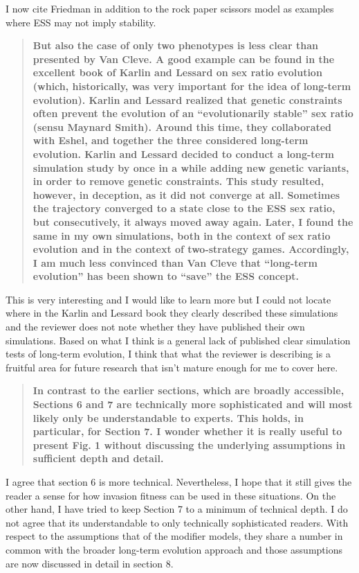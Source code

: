 \documentclass[10pt,parskip=full,foldmarks=off,addrfield=off,backaddress=false,refline=dateleft,letterpaper]{scrlttr2}
\newenvironment{reviewerquote}{\begin{quote}\color{DarkBlue}\bfseries}{\end{quote}}
\begin{document}
\begin{letter}
I now cite Friedman in addition to the rock paper scissors model as examples where ESS may not imply stability.

\begin{reviewerquote}
  But also the case of only two phenotypes is less clear than presented by Van Cleve. A good example can be found in the excellent book of Karlin and Lessard on sex ratio evolution (which, historically, was very important for the idea of long-term evolution). Karlin and Lessard realized that genetic constraints often prevent the evolution of an “evolutionarily stable” sex ratio (sensu Maynard Smith). Around this time, they collaborated with Eshel, and together the three considered long-term evolution. Karlin and Lessard decided to conduct a long-term simulation study by once in a while adding new genetic variants, in order to remove genetic constraints. This study resulted, however, in deception, as it did not converge at all. Sometimes the trajectory converged to a state close to the ESS sex ratio, but consecutively, it always moved away again. Later, I found the same in my own simulations, both in the context of sex ratio evolution and in the context of two-strategy games. Accordingly, I am much less convinced than Van Cleve that “long-term evolution” has been shown to “save” the ESS concept.
\end{reviewerquote}

This is very interesting and I would like to learn more but I could not locate where in the Karlin and Lessard book they clearly described these simulations and the reviewer does not note whether they have published their own simulations. Based on what I think is a general lack of published clear simulation tests of long-term evolution, I think that what the reviewer is describing is a fruitful area for future research that isn't mature enough for me to cover here.

\begin{reviewerquote}
  In contrast to the earlier sections, which are broadly accessible, Sections 6 and 7 are technically more sophisticated and will most likely only be understandable to experts. This holds, in particular, for Section 7. I wonder whether it is really useful to present Fig. 1 without discussing the underlying assumptions in sufficient depth and detail.
\end{reviewerquote}

I agree that section 6 is more technical. Nevertheless, I hope that it still gives the reader a sense for how invasion fitness can be used in these situations. On the other hand, I have tried to keep Section 7 to a minimum of technical depth. I do not agree that its understandable to only technically sophisticated readers. With respect to the assumptions that of the modifier models, they share a number in common with the broader long-term evolution approach and those assumptions are now discussed in detail in section 8.


\end{letter}
\end{document}
